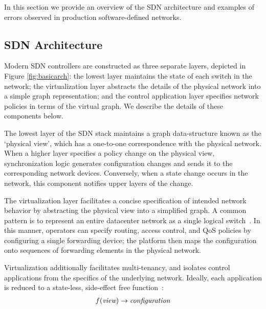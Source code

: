 In this section we provide an overview of the SDN architecture and examples 
of errors observed in production software-defined networks.


\subsection{SDN Architecture}

Modern SDN controllers are constructed as three separate layers, depicted in Figure \ref{fig:basicarch}:
the lowest layer maintains the state of each switch in the network; the virtualization layer 
abstracts the details of the physical network into a simple graph representation;
and the control application layer specifies network policies in terms of the
virtual graph. We describe the details of these components below.

The lowest layer of the SDN stack maintains a graph data-structure known as
the `physical view', which has a one-to-one correspondence with the physical
network. When a higher layer specifies a policy change on the physical view,
synchronization logic generates configuration changes and sends it to the
corresponding network devices. Conversely, when a state change
occurs in the network, this component notifies upper layers of the change.

The virtualization layer facilitates a concise specification of
intended network behavior by abstracting the physical view into a simplified
graph. A common pattern is to represent an entire
datacenter network as a single logical
switch~\cite{Casado:2010:VNF:1921151.1921162}. In this manner, operators
can specify routing, access control, and QoS policies by configuring a single forwarding
device; the platform then maps the configuration onto sequences 
of forwarding elements in the physical network.

Virtualization additionally facilitates multi-tenancy, and isolates control applications from the specifics
of the underlying network. Ideally, each application is reduced to a
state-less, side-effect free function~\cite{keynote}:
\begin{align*}
f(\text{\it view}) \rightarrow \text{\it configuration}
\end{align*}

